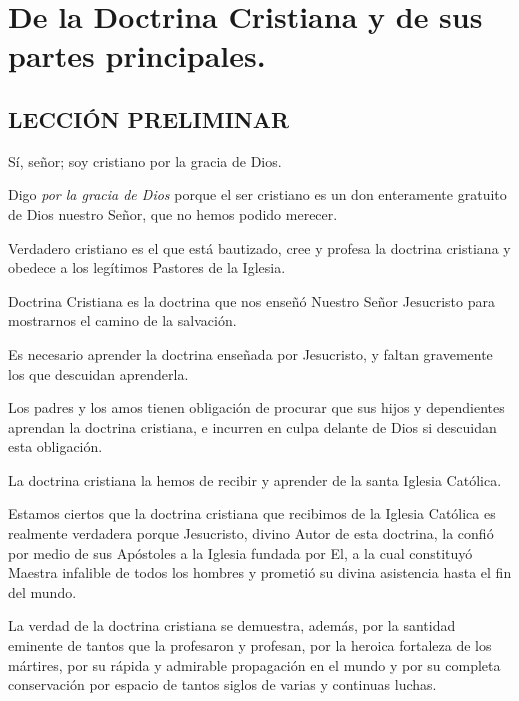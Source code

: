 \chapter{De la Doctrina Cristiana y de sus partes principales.}

\section{LECCIÓN PRELIMINAR}

 Sí, señor; soy cristiano por la gracia de Dios. 

 Digo \textit{por la gracia de Dios} 
porque el ser cristiano es un don enteramente gratuito de Dios nuestro 
Señor, que no hemos podido merecer. 

 Verdadero cristiano es el que está 
bautizado, cree y profesa la doctrina cristiana y obedece a los legítimos 
Pastores de la Iglesia. 

 Doctrina Cristiana es la doctrina que
nos enseñó Nuestro Señor Jesucristo para mostrarnos el camino de la 
salvación. 

 Es 
necesario aprender la doctrina enseñada por Jesucristo, y faltan gravemente 
los que descuidan aprenderla. 

 Los padres y los amos tienen obligación de 
procurar que sus hijos y dependientes aprendan la doctrina cristiana, e 
incurren en culpa delante de Dios si descuidan esta obligación. 

 La
doctrina cristiana la hemos de recibir y aprender de la santa Iglesia Católica. 

 Estamos ciertos que la 
doctrina cristiana que recibimos de la Iglesia Católica es realmente verdadera 
porque Jesucristo, divino Autor de esta doctrina, la confió por medio de sus 
Apóstoles a la Iglesia fundada por El, a la cual constituyó Maestra infalible 
de todos los hombres y prometió su divina asistencia hasta el fin del mundo. 

 La 
verdad de la doctrina cristiana se demuestra, además, por la santidad 
eminente de tantos que la profesaron y profesan, por la heroica fortaleza de 
los mártires, por su rápida y admirable propagación en el mundo y por su 
completa conservación por espacio de tantos siglos de varias y continuas 
luchas. 

